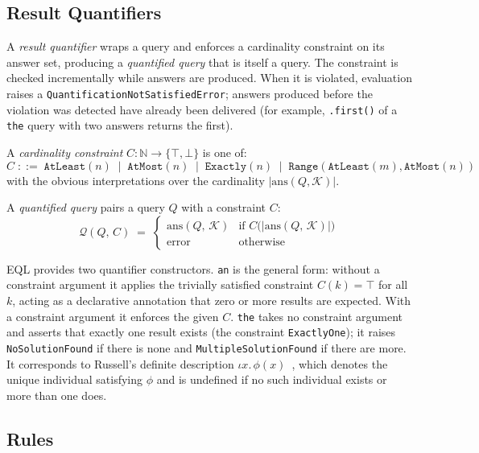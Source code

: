 \documentclass[11pt, a4paper]{article}
\theoremstyle{plain}
\theoremstyle{definition}
\theoremstyle{remark}
\begin{document}
\subsection{Result Quantifiers}
\label{sec:eql:quantifiers}

A \emph{result quantifier} wraps a query and enforces a cardinality constraint on its answer
set, producing a \emph{quantified query} that is itself a query.  The constraint is checked
incrementally while answers are produced.  When it is violated, evaluation raises a
\texttt{QuantificationNotSatisfiedError}; answers produced before the violation was
detected have already been delivered (for example, \texttt{.first()} of a \texttt{the} query with
two answers returns the first).

A \emph{cardinality constraint} $C : \mathbb{N} \to \{\top, \bot\}$ is one of:
\[
  C \;::=\;
    \texttt{AtLeast}(n)
  \;\mid\; \texttt{AtMost}(n)
  \;\mid\; \texttt{Exactly}(n)
  \;\mid\; \texttt{Range}(\texttt{AtLeast}(m), \texttt{AtMost}(n))
\]
with the obvious interpretations over the cardinality $|\mathrm{ans}(Q, \mathcal{K})|$.

A \emph{quantified query} pairs a query $Q$ with a constraint $C$:
\[
  \mathcal{Q}(Q,\, C) \;=\;
  \begin{cases}
    \mathrm{ans}(Q,\,\mathcal{K}) & \text{if } C\!\bigl(|\mathrm{ans}(Q,\,\mathcal{K})|\bigr) \\
    \text{error} & \text{otherwise}
  \end{cases}
\]

EQL provides two quantifier constructors.  \texttt{an} is the general form: without a
constraint argument it applies the trivially satisfied constraint $C(k) = \top$ for all $k$,
acting as a declarative annotation that zero or more results are expected.  With a constraint
argument it enforces the given $C$.  \texttt{the} takes no constraint argument and asserts that
exactly one result exists (the constraint \texttt{ExactlyOne}); it raises
\texttt{NoSolutionFound} if there is none and \texttt{MultipleSolutionFound} if there are more.
It corresponds to Russell's definite description $\iota x.\,\phi(x)$~\cite{russell1905denoting},
which denotes the unique individual satisfying $\phi$ and is undefined if no such individual
exists or more than one does.

\subsection{Rules}
\label{sec:eql:rules}
\end{document}
